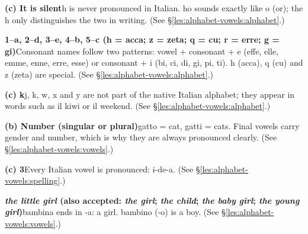 \documentclass[11pt,a4paper,twoside,openright]{book}
\newcommand{\answerheading}[1]{\par\medskip\noindent{\sffamily\bfseries\small #1}\par\nopagebreak}
\begin{document}
\answerheading{\S\ref{les:alphabet-vowels} The alphabet and the vowels}\label{ans:alphabet-vowels}
\begin{answers}
\item\relax \textbf{(c) It is silent}\newline h is never pronounced in Italian. ho sounds exactly like o (or); the h only distinguishes the two in writing. {\color{muted}(See \S\ref{les:alphabet-vowels:alphabet}.)}
\item\relax \textbf{1--a, 2--d, 3--e, 4--b, 5--c {\color{muted}(h = acca; z = zeta; q = cu; r = erre; g = gi)}}\newline Consonant names follow two patterns: vowel + consonant + e (effe, elle, emme, enne, erre, esse) or consonant + i (bi, ci, di, gi, pi, ti). h (acca), q (cu) and z (zeta) are special. {\color{muted}(See \S\ref{les:alphabet-vowels:alphabet}.)}
\item\relax \textbf{(c) k}\newline j, k, w, x and y are not part of the native Italian alphabet; they appear in words such as il kiwi or il weekend. {\color{muted}(See \S\ref{les:alphabet-vowels:alphabet}.)}
\item\relax \textbf{(b) Number (singular or plural)}\newline gatto = cat, gatti = cats. Final vowels carry gender and number, which is why they are always pronounced clearly. {\color{muted}(See \S\ref{les:alphabet-vowels:vowels}.)}
\item\relax \textbf{(c) 3}\newline Every Italian vowel is pronounced: i-de-a. {\color{muted}(See \S\ref{les:alphabet-vowels:spelling}.)}
\item\relax \textbf{\textit{the little girl} {\color{muted}(also accepted: \textit{the girl}; \textit{the child}; \textit{the baby girl}; \textit{the young girl})}}\newline bambina ends in -a: a girl. bambino (-o) is a boy. {\color{muted}(See \S\ref{les:alphabet-vowels:vowels}.)}
\end{answers}
\end{document}
